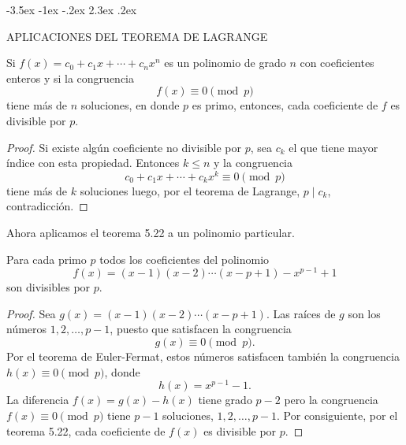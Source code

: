 \documentclass[12pt,a4paper]{book}
\makeatletter
\renewcommand\section{\@startsection{section}{1}{\z@}%
  {-3.5ex \@plus -1ex \@minus -.2ex}%
  {2.3ex \@plus .2ex}%
  {\normalfont\Large\bfseries\raggedright}}
\makeatother
\begin{document}
    \section{APLICACIONES DEL TEOREMA DE LAGRANGE}
    \begin{teorema}
        Si $f(x)=c_{0}+c_{1}x+\cdots+c_{n}x^{n}$ es un polinomio de grado $n$ con coeficientes
        enteros y si la congruencia
        \begin{equation*}
            f(x)\equiv0\pmod{p}
        \end{equation*}
        tiene más de $n$ soluciones, en donde $p$ es primo, entonces, cada coeficiente de
        $f$ es divisible por $p$.
    \end{teorema}

    \begin{proof}
        Si existe algún coeficiente no divisible por $p$, sea $c_{k}$ el que tiene mayor
        índice con esta propiedad. Entonces $k\leq n$ y la congruencia
        \begin{equation*}
            c_{0}+c_{1}x+\cdots+c_{k}x^{k}\equiv0\pmod{p}
        \end{equation*}
        tiene más de $k$ soluciones luego, por el teorema de Lagrange, $p\mid c_{k}$,
        contradicción.
    \end{proof}

    Ahora aplicamos el teorema 5.22 a un polinomio particular.

    \begin{teorema}
        Para cada primo $p$ todos los coeficientes del polinomio
        \begin{equation*}
            f(x)=(x-1)(x-2)\cdots(x-p+1)-x^{p-1}+1
        \end{equation*}
        son divisibles por $p$.
    \end{teorema}

    \begin{proof}
        Sea $g(x)=(x-1)(x-2)\cdots(x-p+1)$. Las raíces de $g$ son los números
        $1,2,\dots,p-1$, puesto que satisfacen la congruencia
        \begin{equation*}
            g(x)\equiv0\pmod{p}.
        \end{equation*}
        Por el teorema de Euler-Fermat, estos números satisfacen también la congruencia
        $h(x)\equiv0\pmod{p}$, donde
        \begin{equation*}
            h(x)=x^{p-1}-1.
        \end{equation*}
        La diferencia $f(x)=g(x)-h(x)$ tiene grado $p-2$ pero la congruencia
        $f(x)\equiv0\pmod{p}$ tiene $p-1$ soluciones, $1,2,\dots,p-1$. Por consiguiente,
        por el teorema 5.22, cada coeficiente de $f(x)$ es divisible por $p$.
    \end{proof}
\end{document}
